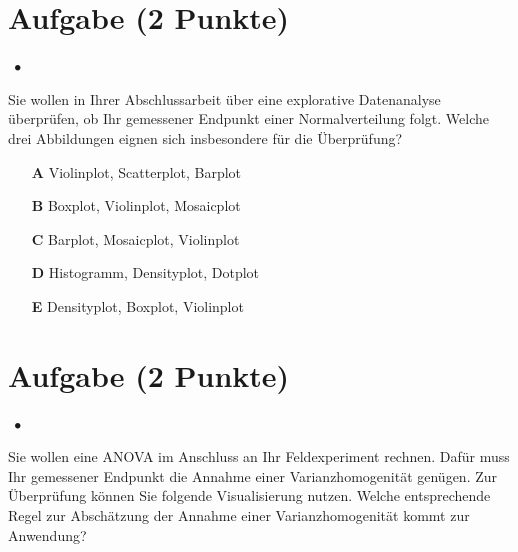 \documentclass[a4paper, 9pt]{scrartcl}\usepackage[]{graphicx}\usepackage[]{xcolor}
\begin{document}
\section{Aufgabe \hfill (2 Punkte)}

\ifcollection
\begin{flushright}
\tiny\vspace{-2Ex}
\textbf{\examinhaltstart}
\exammodulestatversuch $\;\bullet$
\exammodulebiostat
\vspace{-1Ex}
\end{flushright}
\fi




Sie wollen in Ihrer Abschlussarbeit über eine explorative Datenanalyse überprüfen, ob Ihr gemessener Endpunkt einer Normalverteilung folgt. Welche drei Abbildungen eignen sich insbesondere für die Überprüfung?





\begin{enumerate}
\item [\textbf{A} \msquare] Violinplot, Scatterplot, Barplot
\item [\textbf{B} \msquare] Boxplot, Violinplot, Mosaicplot
\item [\textbf{C} \msquare] Barplot, Mosaicplot, Violinplot
\item [\textbf{D} \msquare] Histogramm, Densityplot, Dotplot
\item [\textbf{E} \msquare] Densityplot, Boxplot, Violinplot
\end{enumerate}

\section{Aufgabe \hfill (2 Punkte)}


\ifcollection
\begin{flushright}
\tiny\vspace{-2Ex}
\textbf{\examinhaltstart}
\exammodulestatversuch $\;\bullet$
\exammodulebiostat
\vspace{-1Ex}
\end{flushright}
\fi




Sie wollen eine ANOVA im Anschluss an Ihr Feldexperiment rechnen. Dafür muss Ihr gemessener Endpunkt die Annahme einer Varianzhomogenität genügen. Zur Überprüfung können Sie folgende Visualisierung nutzen. Welche entsprechende Regel zur Abschätzung der Annahme einer Varianzhomogenität kommt zur Anwendung?
\end{document}
